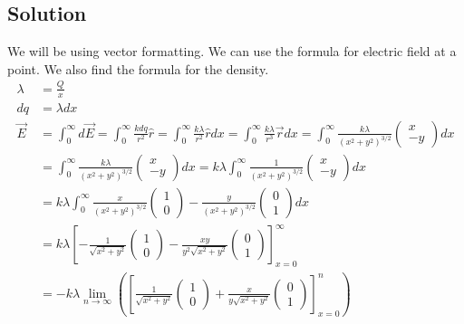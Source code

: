 \documentclass[12pt]{article}
\begin{document}
\subsection{Solution}
We will be using vector formatting. We can use the formula for electric field at a point. We also find the formula for the density.
\begin{align*}
    \lambda &=  \frac{Q}{x}\\
    dq  &=  \lambda dx\\
    \vec{E} &=  \int_{0}^{\infty} d\vec{E}
        =   \int_{0}^{\infty} \frac{k dq}{r^2} \hat{r}
        =   \int_{0}^{\infty} \frac{k \lambda}{r^2} \hat{r} dx
        =   \int_{0}^{\infty} \frac{k \lambda}{r^3} \vec{r} dx
        =   \int_{0}^{\infty} \frac{k \lambda}{(x^2 + y^2)^{3/2}} \begin{pmatrix}x\\-y\end{pmatrix} dx\\
        &=  \int_{0}^{\infty} \frac{k \lambda}{(x^2 + y^2)^{3/2}} \begin{pmatrix}x\\-y\end{pmatrix} dx
        =   k \lambda \int_{0}^{\infty} \frac{1}{(x^2 + y^2)^{3/2}} \begin{pmatrix}x\\-y\end{pmatrix} dx\\
        &=  k \lambda \int_{0}^{\infty} \frac{x}{(x^2 + y^2)^{3/2}} \begin{pmatrix}1\\0\end{pmatrix} - \frac{y}{(x^2 + y^2)^{3/2}} \begin{pmatrix}0\\1\end{pmatrix} dx\\
        &=  k \lambda \left[-\frac{1}{\sqrt{x^2 + y^2}} \begin{pmatrix}1\\0\end{pmatrix} - \frac{xy}{y^2\sqrt{x^2 + y^2}} \begin{pmatrix}0\\1\end{pmatrix}\right]_{x=0}^{\infty}\\
        &=  -k \lambda \lim_{n \rightarrow \infty}\left(\left[\frac{1}{\sqrt{x^2 + y^2}} \begin{pmatrix}1\\0\end{pmatrix} + \frac{x}{y\sqrt{x^2 + y^2}} \begin{pmatrix}0\\1\end{pmatrix}\right]_{x=0}^{n}\right)\\

\end{align*}
\end{document}

